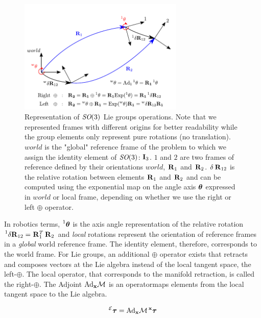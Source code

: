 \begin{figure}[h]
    \centering    \includegraphics[width=0.7\textwidth]{figures/rotation_exp_log.pdf}
    \caption{Representation of $\textit{SO}(3)$ Lie groups operations. Note that we represented frames with different origins
    for better readability while the group elements only represent pure rotations (no translation). $world$ is the "global" reference 
    frame of the problem to which we assign the identity element of $\textit{SO}(3)$: ${\bf I}_3$. $1$ and $2$ are two frames of reference
    defined by their orientations \wrt $world$, $\prescript{}{}{{\bf R}}_{1}$ and $\prescript{}{}{{\bf R}}_{2}$. $\delta \prescript{}{}{{\bf R}}_{12}$ is the relative rotation
    between elements $\prescript{}{}{{\bf R}}_{1}$ and $\prescript{}{}{{\bf R}}_{2}$ and can be computed using the exponential map on the angle axis ${\bm \theta}$ expressed
    in $world$ or local frame, depending on whether we use the right or left $\oplus$ operator.}
    \label{fig:rotation_exp_log} 
\end{figure}

In robotics terms, $\prescript{1}{}{{\bm \theta}}$ is the axis angle representation of the relative rotation $\prescript{1}{}{\delta {\bf R}}_{12} = \prescript{}{}{{\bf R}}_{1}^T\prescript{}{}{{\bf R}}_{2}$ and
\textit{local} rotations represent the orientation of reference frames in a \textit{global} world reference frame. The identity element, therefore, corresponds 
to the world frame. For Lie groups, an additional $\oplus$ operator exists that retracts and composes vectors at the Lie algebra instead of
the local tangent space, the left-$\oplus$. The local operator, that corresponds to the manifold retraction, is called the right-$\oplus$. 
The Adjoint $\text{Ad}_{{\bf x}}\mathcal{M}$ is an operatormaps elements from the local tangent space to the Lie algebra. 

\begin{equation}
    \prescript{\mathcal{E}}{}{{\bm \tau}} = \text{Ad}_{{\bf x}}\mathcal{M} \prescript{{\bf x}}{}{{\bm \tau}} 
\end{equation}

